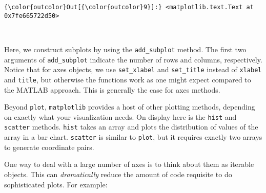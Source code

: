 \documentclass{article}
\begin{document}
            \begin{Verbatim}[commandchars=\\\{\}]
{\color{outcolor}Out[{\color{outcolor}9}]:} <matplotlib.text.Text at 0x7fe665722d50>
\end{Verbatim}
        
    \begin{center}
    \end{center}
    { \hspace*{\fill} \\}
    
    Here, we construct subplots by using the \texttt{add\_subplot} method.
The first two arguments of \texttt{add\_subplot} indicate the number of
rows and columns, respectively. Notice that for axes objects, we use
\texttt{set\_xlabel} and \texttt{set\_title} instead of \texttt{xlabel}
and \texttt{title}, but otherwise the functions work as one might expect
compared to the MATLAB approach. This is generally the case for axes
methods.

Beyond \texttt{plot}, \texttt{matplotlib} provides a host of other
plotting methods, depending on exactly what your visualization needs. On
display here is the \texttt{hist} and \texttt{scatter} methods.
\texttt{hist} takes an array and plots the distribution of values of the
array in a bar chart. \texttt{scatter} is similar to \texttt{plot}, but
it requires exactly two arrays to generate coordinate pairs.

One way to deal with a large number of axes is to think about them as
iterable objects. This can \emph{dramatically} reduce the amount of code
requisite to do sophisticated plots. For example:
\end{document}
